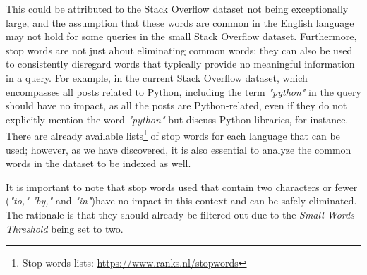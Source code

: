 {This could be attributed to the Stack Overflow dataset not being exceptionally large, and the assumption that these words are common in the English language may not hold for some queries in the small Stack Overflow dataset. Furthermore, stop words are not just about eliminating common words; they can also be used to consistently disregard words that typically provide no meaningful information in a query. For example, in the current Stack Overflow dataset, which encompasses all posts related to Python, including the term \textit{"python"} in the query should have no impact, as all the posts are Python-related, even if they do not explicitly mention the word \textit{"python"} but discuss Python libraries, for instance. There are already available lists\footnote{Stop words lists: \url{https://www.ranks.nl/stopwords}} of stop words for each language that can be used; however, as we have discovered, it is also essential to analyze the common words in the dataset to be indexed as well. 

It is important to note that stop words used that contain two characters or fewer (\textit{"to,"} \textit{"by,"} and \textit{"in"})have no impact in this context and can be safely eliminated. The rationale is that they should already be filtered out due to the \textit{Small Words Threshold} being set to two.

}
